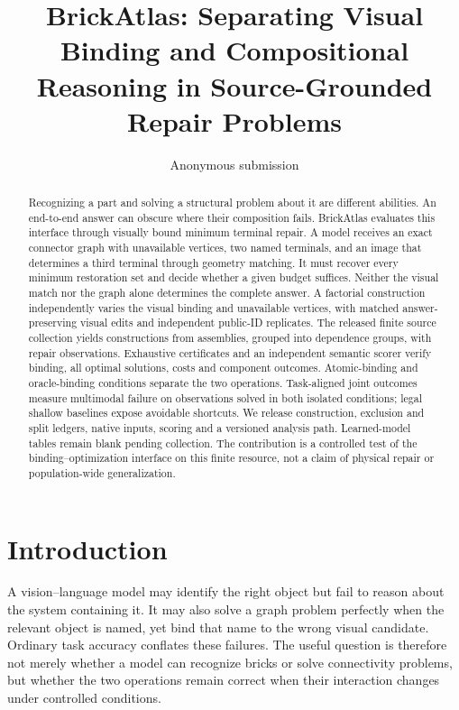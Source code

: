 \documentclass[10pt,twocolumn,letterpaper]{article}
\title{BrickAtlas: Separating Visual Binding and Compositional\\
Reasoning in Source-Grounded Repair Problems}
\author{Anonymous submission}
\begin{document}
\maketitle
\raggedbottom

\begin{abstract}
Recognizing a part and solving a structural problem about it are
different abilities. An end-to-end answer can obscure where their
composition fails. BrickAtlas evaluates this interface through
visually bound minimum terminal repair. A model receives an exact
connector graph with unavailable vertices, two named terminals, and
an image that determines a third terminal through geometry matching.
It must recover every minimum restoration set and decide whether a
given budget suffices. Neither the visual match nor the graph alone
determines the complete answer. A factorial construction independently
varies the visual binding and unavailable vertices, with matched
answer-preserving visual edits and independent public-ID replicates.
The released finite source collection yields \VRConstructions{}
constructions from \VRSources{} assemblies, grouped into \VRGroups{}
dependence groups, with \VRObservations{} repair observations.
Exhaustive certificates and an independent semantic scorer verify
binding, all optimal solutions, costs and component outcomes.
Atomic-binding and oracle-binding conditions separate the two
operations. Task-aligned joint outcomes measure multimodal failure
on observations solved in both isolated conditions; legal shallow
baselines expose avoidable shortcuts.
We release construction, exclusion and split ledgers, native inputs,
scoring and a versioned analysis path. Learned-model tables remain
blank pending collection. The contribution is a controlled test
of the binding--optimization interface on this finite resource,
not a claim of physical repair or population-wide generalization.
\end{abstract}

\section{Introduction}
A vision--language model may identify the right object but fail to
reason about the system containing it. It may also solve a graph
problem perfectly when the relevant object is named, yet bind that
name to the wrong visual candidate. Ordinary task accuracy conflates
these failures. The useful question is therefore not merely whether
a model can recognize bricks or solve connectivity problems, but
whether the two operations remain correct when their interaction
changes under controlled conditions.
\end{document}
